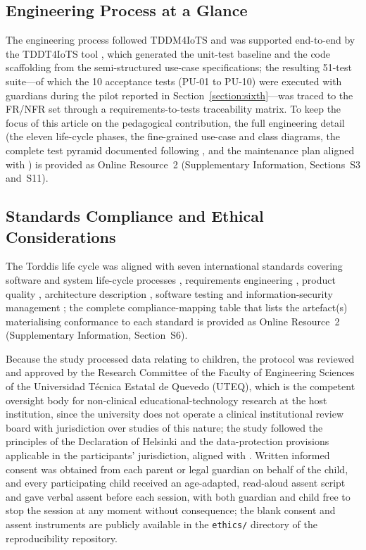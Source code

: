 \subsection{Engineering Process at a Glance}
The engineering process followed TDDM4IoTS \citep{Guerrero-Ulloa2020TDDM4IoTS} and was supported end-to-end by the TDDT4IoTS tool \citep{Guerrero2024Test}, which generated the unit-test baseline and the code scaffolding from the semi-structured use-case specifications; the resulting 51-test suite---of which the 10 acceptance tests (PU-01 to PU-10) were executed with guardians during the pilot reported in Section~\ref{section:sixth}---was traced to the FR/NFR set through a requirements-to-tests traceability matrix. To keep the focus of this article on the pedagogical contribution, the full engineering detail (the eleven life-cycle phases, the fine-grained use-case and class diagrams, the complete test pyramid documented following \citet{ISO-IEC-IEEE29119-1-2022}, and the maintenance plan aligned with \citet{ISO-IEC-IEEE12207-2017}) is provided as Online Resource~2 (Supplementary Information, Sections~S3 and~S11).

\subsection{Standards Compliance and Ethical Considerations}
\label{ss:standards}
The Torddis life cycle was aligned with seven international standards covering software and system life-cycle processes \citep{ISO-IEC-IEEE12207-2017,ISO-IEC-IEEE15288-2023}, requirements engineering \citep{ISO-IEC-IEEE29148-2018}, product quality \citep{ISO-IEC25010-2023}, architecture description \citep{ISO-IEC-IEEE42010-2022}, software testing \citep{ISO-IEC-IEEE29119-1-2022} and information-security management \citep{ISO-IEC27001-2022}; the complete compliance-mapping table that lists the artefact(s) materialising conformance to each standard is provided as Online Resource~2 (Supplementary Information, Section~S6).

Because the study processed data relating to children, the protocol was reviewed and approved by the Research Committee of the Faculty of Engineering Sciences of the Universidad T\'ecnica Estatal de Quevedo (UTEQ), which is the competent oversight body for non-clinical educational-technology research at the host institution, since the university does not operate a clinical institutional review board with jurisdiction over studies of this nature; the study followed the principles of the Declaration of Helsinki and the data-protection provisions applicable in the participants' jurisdiction, aligned with \citet{ISO-IEC27001-2022}. Written informed consent was obtained from each parent or legal guardian on behalf of the child, and every participating child received an age-adapted, read-aloud assent script and gave verbal assent before each session, with both guardian and child free to stop the session at any moment without consequence; the blank consent and assent instruments are publicly available in the \texttt{ethics/} directory of the reproducibility repository.

